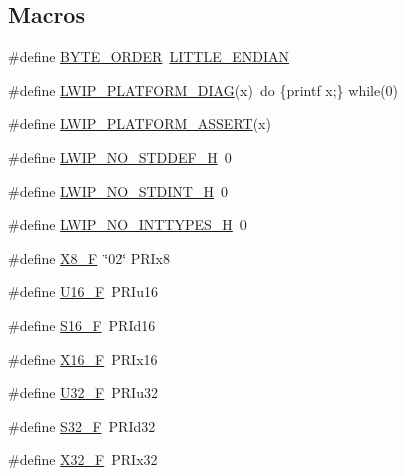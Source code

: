 \subsection*{Macros}
\begin{DoxyCompactItemize}
\item 
\#define \hyperlink{group__compiler__abstraction_ga1771b7fb65ee640524d0052f229768c3}{B\+Y\+T\+E\+\_\+\+O\+R\+D\+ER}~\hyperlink{openmote-cc2538_2lwip_2src_2include_2lwip_2arch_8h_a8782a401fbf55261460863fc2f8df1ce}{L\+I\+T\+T\+L\+E\+\_\+\+E\+N\+D\+I\+AN}
\item 
\#define \hyperlink{group__compiler__abstraction_gaccef167be13a500ce30036030a9b142b}{L\+W\+I\+P\+\_\+\+P\+L\+A\+T\+F\+O\+R\+M\+\_\+\+D\+I\+AG}(x)~do \{printf x;\} while(0)
\item 
\#define \hyperlink{group__compiler__abstraction_ga7e8bcd0282525704d6dd596bdd1b47d0}{L\+W\+I\+P\+\_\+\+P\+L\+A\+T\+F\+O\+R\+M\+\_\+\+A\+S\+S\+E\+RT}(x)
\item 
\#define \hyperlink{group__compiler__abstraction_ga53954d507c09e521ec0d44a2450bb89d}{L\+W\+I\+P\+\_\+\+N\+O\+\_\+\+S\+T\+D\+D\+E\+F\+\_\+H}~0
\item 
\#define \hyperlink{group__compiler__abstraction_ga122c754db96ecad23bc6f4541d6360c1}{L\+W\+I\+P\+\_\+\+N\+O\+\_\+\+S\+T\+D\+I\+N\+T\+\_\+H}~0
\item 
\#define \hyperlink{group__compiler__abstraction_ga5bf52d6f2729d0c8afd365f69d7d4373}{L\+W\+I\+P\+\_\+\+N\+O\+\_\+\+I\+N\+T\+T\+Y\+P\+E\+S\+\_\+H}~0
\item 
\#define \hyperlink{group__compiler__abstraction_ga90c130a97711a9d7e5015c610f2dfe8f}{X8\+\_\+F}~\char`\"{}02\char`\"{} P\+R\+Ix8
\item 
\#define \hyperlink{group__compiler__abstraction_gaa9d7f6eb2ee9fcc5eda3545dbb1886e0}{U16\+\_\+F}~P\+R\+Iu16
\item 
\#define \hyperlink{group__compiler__abstraction_gac05a82d37afb251470f5e17ca15ab6e9}{S16\+\_\+F}~P\+R\+Id16
\item 
\#define \hyperlink{group__compiler__abstraction_ga1418f92673e54a36b6e376109e526382}{X16\+\_\+F}~P\+R\+Ix16
\item 
\#define \hyperlink{group__compiler__abstraction_gad8b0a364e95b07cb0c47709fdc6037d6}{U32\+\_\+F}~P\+R\+Iu32
\item 
\#define \hyperlink{group__compiler__abstraction_ga4b1eca99bc81e248c7074ea87fc9ca63}{S32\+\_\+F}~P\+R\+Id32
\item 
\#define \hyperlink{group__compiler__abstraction_gac219830a93d05c5f18f64ce87a34be14}{X32\+\_\+F}~P\+R\+Ix32

\end{DoxyCompactItemize}
